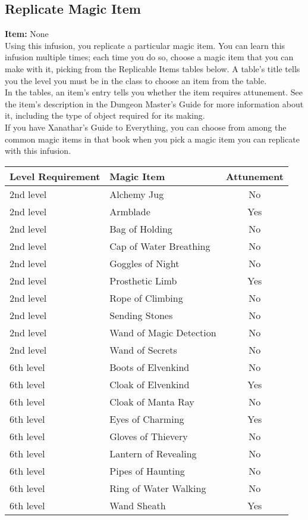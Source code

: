 \documentclass[11pt, A4paper, english]{article}
\begin{document}
		\subsection{Replicate Magic Item}
\textbf{Item:} None \\
Using this infusion, you replicate a particular magic item. You can learn this infusion multiple times; each time you do so, choose a magic item that you can make with it, picking from the Replicable Items tables below. A table's title tells you the level you must be in the class to choose an item from the table. \\
In the tables, an item's entry tells you whether the item requires attunement. See the item's description in the Dungeon Master's Guide for more information about it, including the type of object required for its making. \\
If you have Xanathar's Guide to Everything, you can choose from among the common magic items in that book when you pick a magic item you can replicate with this infusion. \\
			\begin{tabularx}{107.5mm}{|l|l|c|}
\hline
Level Requirement	& Magic Item						& Attunement	\\
\hline
2nd level			& Alchemy Jug						& No			\\
2nd level			& Armblade							& Yes			\\
2nd level			& Bag of Holding					& No			\\
2nd level			& Cap of Water Breathing			& No			\\
2nd level			& Goggles of Night					& No			\\
2nd level			& Prosthetic Limb					& Yes			\\
2nd level			& Rope of Climbing					& No			\\
2nd level			& Sending Stones					& No			\\
2nd level			& Wand of Magic Detection			& No			\\
2nd level			& Wand of Secrets					& No 			\\
\hline
6th level			& Boots of Elvenkind				& No			\\
6th level			& Cloak of Elvenkind				& Yes			\\
6th level			& Cloak of Manta Ray				& No			\\
6th level			& Eyes of Charming					& Yes			\\
6th level			& Gloves of Thievery				& No			\\
6th level			& Lantern of Revealing				& No			\\
6th level			& Pipes of Haunting					& No			\\
6th level			& Ring of Water Walking				& No			\\
6th level			& Wand Sheath						& Yes			\\
\hline
			\end{tabularx} \\
\end{document}
